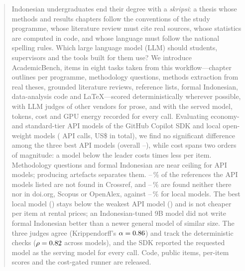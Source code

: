 \begin{abstract}
Indonesian undergraduates end their degree with a \emph{skripsi}: a thesis whose methods and results chapters follow the conventions of the study programme, whose literature review must cite real sources, whose statistics are computed in code, and whose language must follow the national spelling rules. Which large language model (LLM) should students, supervisors and the tools built for them use? We introduce AcademicBench, \NItems{} items in eight tasks taken from this workflow---chapter outlines per programme, methodology questions, methods extraction from real theses, grounded literature reviews, reference lists, formal Indonesian, data-analysis code and LaTeX---scored deterministically wherever possible, with LLM judges of other vendors for prose, and with the served model, tokens, cost and GPU energy recorded for every call. Evaluating \NApi{} economy- and standard-tier API models of the GitHub Copilot SDK and \NLocal{} local open-weight models (\NApiCalls{} API calls, US\$\StudyUSD{} in total), we find no significant difference among the three best API models (overall \ThirdScore{}--\TopScore{}), while cost spans two orders of magnitude: a model \CheapGap{} below the leader costs \CostRatio{} times less per item. Methodology questions and formal Indonesian are near ceiling for API models; producing artefacts separates them. \HalApiMin{}--\HalApiMax{}\,\% of the references the API models listed are not found in Crossref, and \NoneApiMin{}--\NoneApiMax{}\,\% are found neither there nor in doi.org, Scopus or OpenAlex, against \NoneLocMin{}--\NoneLocMax{}\,\% for local models. The best local model (\BestLocalScore{}) stays below the weakest API model (\WorstApiScore{}) and is not cheaper per item at rental prices; an Indonesian-tuned 9B model did not write formal Indonesian better than a newer general model of similar size. The three judges agree (Krippendorff's $\alpha=\AlphaJudges{}$) and track the deterministic checks ($\rho=\RhoModelGrd{}$ across models), and the SDK reported the requested model as the serving model for every call. Code, public items, per-item scores and the cost-gated runner are released.
\end{abstract}
